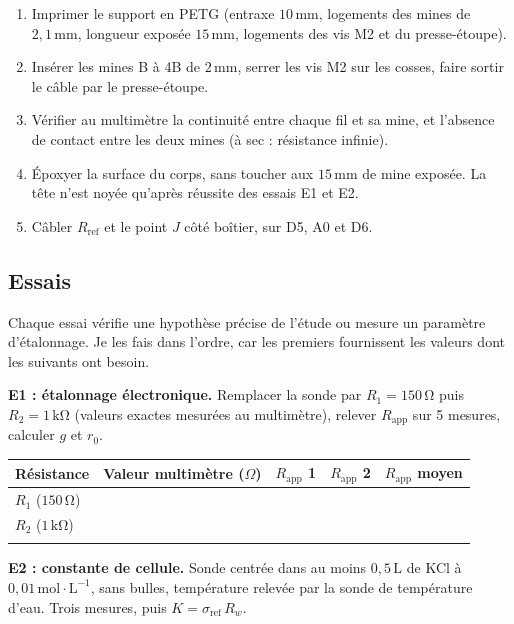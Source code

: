 \documentclass[11pt,a4paper]{article}
\newcommand{\ligne}{\arrayrulecolor{ligneENO}\specialrule{0.4pt}{0pt}{0pt}\arrayrulecolor{black}}
\newcommand{\U}[1]{\,\mathrm{#1}}
\begin{document}
\begin{enumerate}[nosep]
\item Imprimer le support en PETG (entraxe $10\U{mm}$, logements des mines de $2{,}1\U{mm}$, longueur exposée $15\U{mm}$, logements des vis M2 et du presse-étoupe).
\item Insérer les mines B à 4B de $2\U{mm}$, serrer les vis M2 sur les cosses, faire sortir le câble par le presse-étoupe.
\item Vérifier au multimètre la continuité entre chaque fil et sa mine, et l'absence de contact entre les deux mines (à sec : résistance infinie).
\item Époxyer la surface du corps, sans toucher aux $15\U{mm}$ de mine exposée. La tête n'est noyée qu'après réussite des essais E1 et E2.
\item Câbler $R_{\text{ref}}$ et le point $J$ côté boîtier, sur D5, A0 et D6.
\end{enumerate}

\subsection{Essais}

Chaque essai vérifie une hypothèse précise de l'étude ou mesure un paramètre d'étalonnage. Je les fais dans l'ordre, car les premiers fournissent les valeurs dont les suivants ont besoin.


\textbf{E1 : étalonnage électronique.} Remplacer la sonde par $R_1 = 150\U{\Omega}$ puis $R_2 = 1\U{k\Omega}$ (valeurs exactes mesurées au multimètre), relever $R_{\text{app}}$ sur 5 mesures, calculer $g$ et $r_0$.

\begin{center}
\begin{tabular}{p{3.6cm} p{3.2cm} p{2.2cm} p{2.2cm} p{2.4cm}}
\toprule
\textbf{Résistance} & \textbf{Valeur multimètre ($\Omega$)} & \textbf{$R_{\text{app}}$ 1} & \textbf{$R_{\text{app}}$ 2} & \textbf{$R_{\text{app}}$ moyen} \\
\midrule
$R_1$ ($150\U{\Omega}$) & & & & \\ \ligne
$R_2$ ($1\U{k\Omega}$) & & & & \\ \ligne
\multicolumn{5}{l}{Résultat : $g =$ \hspace{4cm} $r_0 =$} \\
\bottomrule
\end{tabular}
\end{center}

\textbf{E2 : constante de cellule.} Sonde centrée dans au moins $0{,}5\U{L}$ de KCl à $0{,}01\U{mol \cdot L^{-1}}$, sans bulles, température relevée par la sonde de température d'eau. Trois mesures, puis $K = \sigma_{\text{ref}} \, R_w$.
\end{document}
